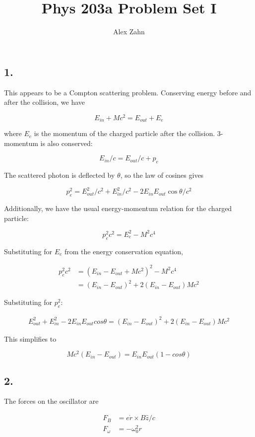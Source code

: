 \documentclass[12pt]{article}
\author{Alex Zahn}
\title{Phys 203a Problem Set I}
\date{}
\begin{document}
\maketitle

\subsection*{1.}

This appears to be a Compton scattering problem. Conserving energy before and after the collision, we have

\[E_{in} + Mc^2 = E_{out} + E_e
\]

\noindent where \(E_{e}\) is the momentum of the charged particle after the collision. 3-momentum is also conserved:

\[E_{in}/c = E_{out}/c + p_{e}
\]

\noindent The scattered photon is deflected by \(\theta\), so the law of cosines gives

\[p_{e}^2 = E_{out}^2/c^2 + E_{in}^2/c^2 - 2E_{in}E_{out}\cos{\theta}/c^2
\]

\noindent Additionally, we have the usual energy-momentum relation for the charged particle:

\[p_{e}^2c^2 = E_{e}^2 - M^2c^4\]

\noindent Substituting for \(E_e\) from the energy conservation equation,

\begin{align*}
p_e^2c^2 &= (E_{in} - E_{out} + Mc^2)^2 - M^2c^4 \\
&= (E_{in} - E_{out})^2 + 2(E_{in} - E_{out})Mc^2
\end{align*}

\noindent Substituting for \(p_e^2\):

\begin{align*}
E_{out}^2 + E_{in}^2 - 2E_{in}E_{out}cos\theta = (E_{in} - E_{out})^2 + 2(E_{in} - E_{out})Mc^2
\end{align*}

\noindent This simplifies to

\[Mc^2(E_{in}-E_{out}) = E_{in}E_{out}(1-cos\theta)
\]


\subsection*{2.}

\noindent The forces on the oscillator are 

\begin{align*}
F_B &= e\dot{r}\times B\hat{z}/c \\
F_\omega  &= -\omega_0^2r
\end{align*}
\end{document}
